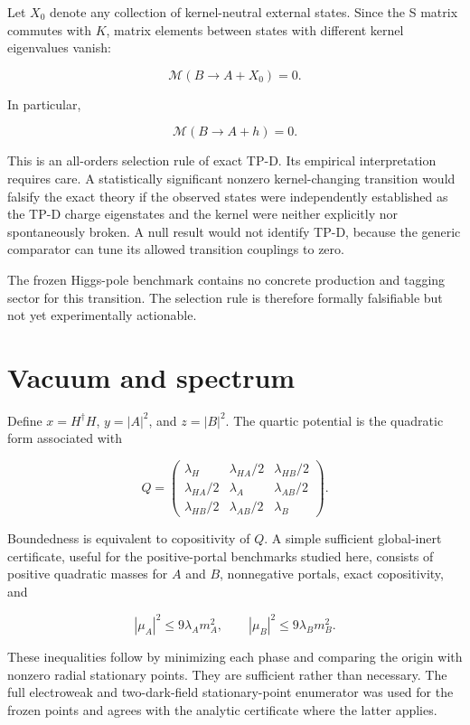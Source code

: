 \documentclass[
]{article}
\begin{document}
Let \(X_0\) denote any collection of kernel-neutral external states.
Since the S matrix commutes with \(K\), matrix elements between states
with different kernel eigenvalues vanish:

\[
\mathcal M(B\to A+X_0)=0.
\]

In particular,

\[
\mathcal M(B\to A+h)=0.
\]

This is an all-orders selection rule of exact TP-D. Its empirical
interpretation requires care. A statistically significant nonzero
kernel-changing transition would falsify the exact theory if the
observed states were independently established as the TP-D charge
eigenstates and the kernel were neither explicitly nor spontaneously
broken. A null result would not identify TP-D, because the generic
comparator can tune its allowed transition couplings to zero.

The frozen Higgs-pole benchmark contains no concrete production and
tagging sector for this transition. The selection rule is therefore
formally falsifiable but not yet experimentally actionable.

\hypertarget{vacuum-and-spectrum}{%
\section{Vacuum and spectrum}\label{vacuum-and-spectrum}}

Define \(x=H^\dagger H\), \(y=|A|^2\), and \(z=|B|^2\). The quartic
potential is the quadratic form associated with

\[
Q=\begin{pmatrix}
\lambda_H&\lambda_{HA}/2&\lambda_{HB}/2\\
\lambda_{HA}/2&\lambda_A&\lambda_{AB}/2\\
\lambda_{HB}/2&\lambda_{AB}/2&\lambda_B
\end{pmatrix}.
\]

Boundedness is equivalent to copositivity of \(Q\). A simple sufficient
global-inert certificate, useful for the positive-portal benchmarks
studied here, consists of positive quadratic masses for \(A\) and \(B\),
nonnegative portals, exact copositivity, and

\[
|\mu_A|^2\leq9\lambda_A m_A^2,\qquad
|\mu_B|^2\leq9\lambda_B m_B^2.
\]

These inequalities follow by minimizing each phase and comparing the
origin with nonzero radial stationary points. They are sufficient rather
than necessary. The full electroweak and two-dark-field stationary-point
enumerator was used for the frozen points and agrees with the analytic
certificate where the latter applies.
\end{document}
